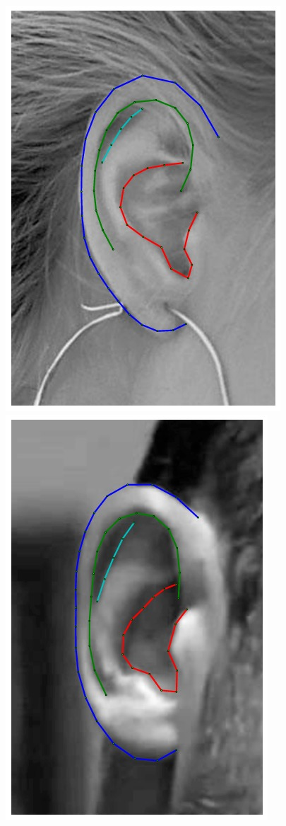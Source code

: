 \begin{figure}[!t]
    \includegraphics[height=\flowh]{resources/Ear_Deformable_Model/fittings/final_0011}
    \includegraphics[height=\flowh]{resources/Ear_Deformable_Model/fittings/final_0003}

\end{figure}

